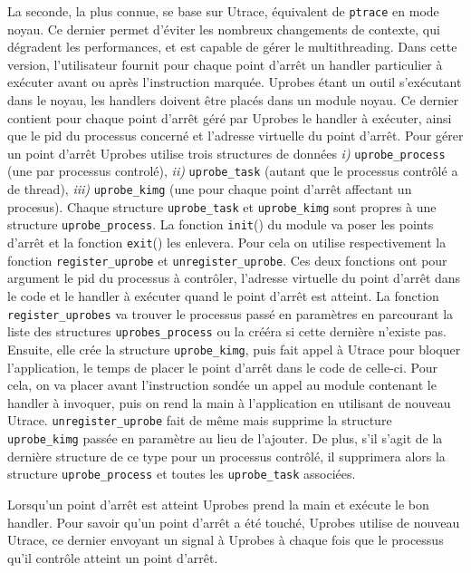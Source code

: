 La seconde, la plus connue, se base sur Utrace, équivalent de \texttt{ptrace} en
mode noyau. Ce dernier permet d'éviter les nombreux changements de contexte, qui
dégradent les performances, et est capable de gérer le multithreading. Dans
cette version, l'utilisateur fournit pour chaque point d'arrêt un handler
particulier à exécuter avant ou après l’instruction marquée. Uprobes étant un
outil s'exécutant dans le noyau, les handlers doivent être placés dans un module
noyau. Ce dernier contient pour chaque point d'arrêt géré par Uprobes le handler
à exécuter, ainsi que le pid du processus concerné et l'adresse virtuelle du
point d'arrêt. Pour gérer un point d'arrêt Uprobes utilise trois structures de
données \textit{i)} \texttt{uprobe\_process} (une par processus controlé),
\textit{ii)} \texttt{uprobe\_task} (autant que le processus contrôlé a de
thread), \textit{iii)} \texttt{uprobe\_kimg} (une pour chaque point d'arrêt
affectant un procesus). Chaque structure \texttt{uprobe\_task} et
\texttt{uprobe\_kimg} sont propres à une structure \texttt{uprobe\_process}. La
fonction \texttt{init}() du module va poser les points d'arrêt et la fonction
\texttt{exit}() les enlevera. Pour cela on utilise respectivement la fonction
\texttt{register\_uprobe} et \texttt{unregister\_uprobe}. Ces deux fonctions ont
pour argument le pid du processus à contrôler, l'adresse virtuelle du point
d'arrêt dans le code et le handler à exécuter quand le point d'arrêt est
atteint. La fonction \texttt{register\_uprobes} va trouver le processus passé en
paramètres en parcourant la liste des structures \texttt{uprobes\_process} ou la
crééra si cette dernière n'existe pas. Ensuite, elle crée la structure
\texttt{uprobe\_kimg}, puis fait appel à Utrace pour bloquer l'application, le
temps de placer le point d'arrêt dans le code de celle-ci. Pour cela, on va
placer avant l'instruction sondée un appel au module contenant le handler à
invoquer, puis on rend la main à l'application en utilisant de nouveau
Utrace. \texttt{unregister\_uprobe} fait de même mais supprime la structure
\texttt{uprobe\_kimg} passée en paramètre au lieu de l'ajouter. De plus, s'il
s'agit de la dernière structure de ce type pour un processus contrôlé, il
supprimera alors la structure \texttt{uprobe\_process} et toutes les
\texttt{uprobe\_task} associées.

Lorsqu'un point d'arrêt est atteint Uprobes prend la main et exécute le bon
handler. Pour savoir qu'un point d'arrêt a été touché, Uprobes utilise de
nouveau Utrace, ce dernier envoyant un signal à Uprobes à chaque fois que le
processus qu'il contrôle atteint un point d'arrêt.


